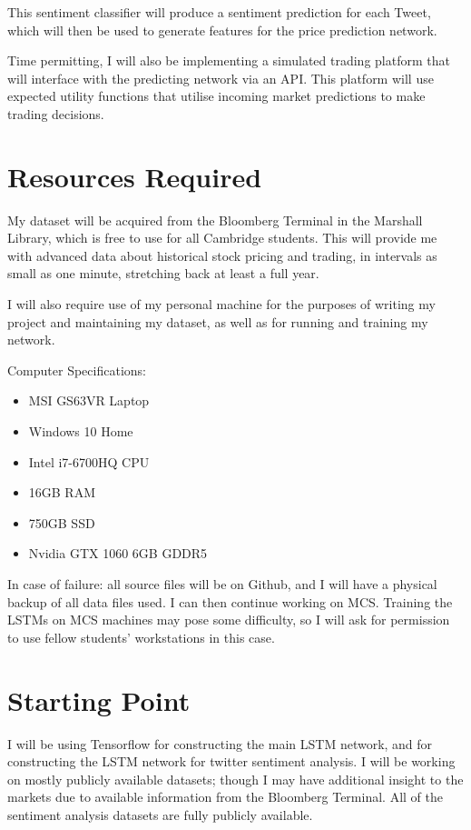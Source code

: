 \documentclass[12pt,a4paper,twoside,openright]{report}
\begin{document}
This sentiment classifier will produce a sentiment prediction for each Tweet, which will then be
used to generate features for the price prediction network.

Time permitting, I will also be implementing a simulated trading platform that will interface with
the predicting network via an API. This platform will use expected utility functions that utilise
incoming market predictions to make trading decisions.

\section*{Resources Required}
My dataset will be acquired from the Bloomberg Terminal in the Marshall Library, which is free
to use for all Cambridge students. This will provide me with advanced data about historical stock
pricing and trading, in intervals as small as one minute, stretching back at least a full year.

I will also require use of my personal machine for the purposes of writing my project and
maintaining my dataset, as well as for running and training my network.

Computer Specifications:

\begin{itemize}
\item
MSI GS63VR Laptop

\item
Windows 10 Home

\item
Intel i7-6700HQ CPU

\item
16GB RAM

\item
750GB SSD

\item
Nvidia GTX 1060 6GB GDDR5
\end{itemize}

In case of failure: all source files will be on Github, and I will have a physical backup of all data
files used. I can then continue working on MCS. Training the LSTMs on MCS machines may
pose some difficulty, so I will ask for permission to use fellow students’ workstations in this
case.

\section*{Starting Point}
I will be using Tensorflow for constructing the main LSTM network, and for constructing the
LSTM network for twitter sentiment analysis. I will be working on mostly publicly available
datasets; though I may have additional insight to the markets due to available information from
the Bloomberg Terminal. All of the sentiment analysis datasets are fully publicly available.
\end{document}
